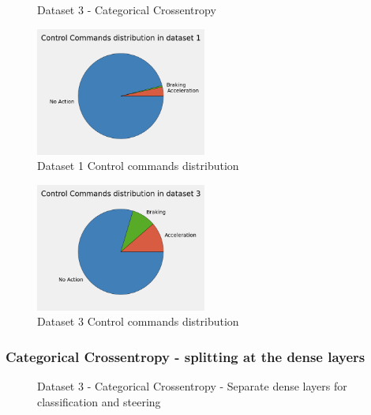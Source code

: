 \begin{figure}[h]
	\centering
    \def\svgwidth{\textwidth}
    \caption{Dataset 3 - Categorical Crossentropy}
    \label{fig:ds3categoricalcrossentropy}
\end{figure}
\begin{figure}[h]
    \centering
    \includegraphics[width=0.5\textwidth]{figures/png/dataset1_control_cmds.png}
    \caption{Dataset 1 Control commands distribution}
    \label{fig:dataset1ctrlcmds}
\end{figure}
\begin{figure}[h]
    \centering
    \includegraphics[width=0.5\textwidth]{figures/png/dataset3_control_cmds.png}
    \caption{Dataset 3 Control commands distribution}
    \label{fig:dataset3ctrlcmds}
\end{figure}

\subsubsection*{Categorical Crossentropy - splitting at the dense layers}
\begin{figure}[h]
	\centering
    \def\svgwidth{\textwidth}
    \caption{Dataset 3 - Categorical Crossentropy - Separate dense layers for
    classification and steering}
    \label{fig:ds3categoricalcrossentropydense}
\end{figure}
